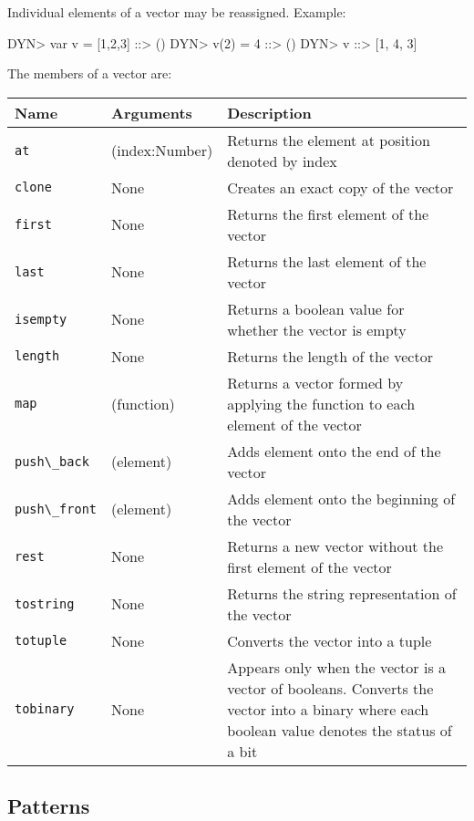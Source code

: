 \documentclass[11pt]{article}
\newcommand{\literal}[1]{\lstinline[style=DSL,identifierstyle=\itshape]!#1!}
\newcommand{\variable}[1]{\literal{#1}}
\begin{document}
Individual elements of a vector may be reassigned.  Example:

\begin{dsl}
DYN> var v = [1,2,3]
::> ()
DYN> v(2) = 4
::> ()
DYN> v
::> [1, 4, 3]
\end{dsl}

The members of a vector are:

\begin{center}
\begin{tabular}{|l|l|p{3.5in}|}
\hline
Name & Arguments & Description\\
\hline
\variable{at} & (index:Number) & Returns the element at position denoted by index \\
\hline
\variable{clone} & None & Creates an exact copy of the vector\\
\hline
\variable{first} & None & Returns the first element of the vector\\
\hline
\variable{last} & None & Returns the last element of the vector\\
\hline
\variable{isempty} & None & Returns a boolean value for whether the vector is empty\\
\hline
\variable{length} & None & Returns the length of the vector\\
\hline
\variable{map} & (function) & Returns a vector formed by applying the function to each element of the vector\\
\hline
\variable{push\_back} & (element) & Adds element onto the end of the vector\\
\hline
\variable{push\_front} & (element) & Adds element onto the beginning of the vector\\
\hline
\variable{rest} & None & Returns a new vector without the first element of the vector\\
\hline
\variable{tostring} & None & Returns the string representation of the vector\\
\hline
\variable{totuple} & None & Converts the vector into a tuple\\
\hline
\variable{tobinary} & None & Appears only when the vector is a vector of booleans.  Converts the vector into a binary where each boolean value denotes the status of a bit\\
\hline
\end{tabular}
\end{center}

\subsection{Patterns}
\end{document}
